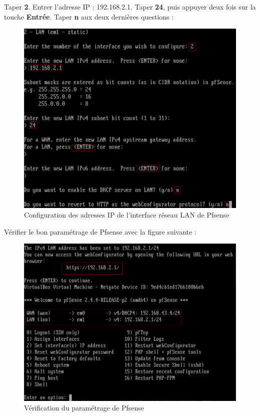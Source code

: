 \newpage
Taper \textbf{2}. Entrer l'adresse IP : 192.168.2.1. Taper \textbf{24}, puis appuyer deux fois sur la touche \textbf{Entrée}. Taper \textbf{n} aux deux dernières questions :
\begin{figure}[h!]
	\begin{center}
		\includegraphics[scale=0.5]{Pfsense_Screeshots/17.png}
		\caption{Configuration des adresses IP de l'interface réseau LAN de Pfsense}
		\label{Pfsense_Screeshots/17}
	\end{center}
\end{figure}
\FloatBarrier    

\newpage
Vérifier le bon paramétrage de Pfsense avec la figure suivante :
\begin{figure}[h!]
	\begin{center}
		\includegraphics[scale=0.5]{Pfsense_Screeshots/18.png}
		\caption{Vérification du paramétrage de Pfsense}
		\label{Pfsense_Screeshots/18}
	\end{center}
\end{figure}
\FloatBarrier


